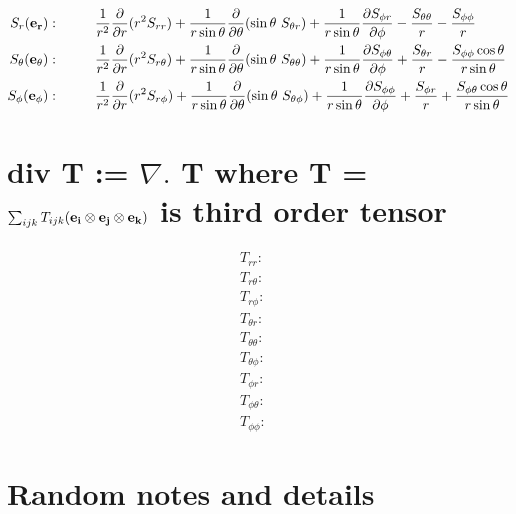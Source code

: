 \documentclass[11pt]{article}
\newcommand{\dr}{\frac{\partial}{\partial r}}
\begin{document}

\begin{align}
S_r ({\bf{e_r}}): & \hspace{1cm} \frac{1}{r^2}\dr (r^2 S_{rr}) + \frac{1}{r\sin{\theta}}\frac{\partial}{\partial \theta} (\sin{\theta} \ S_{\theta r}) + \frac{1}{r\sin{\theta}}\frac{\partial S_{\phi r}}{\partial \phi} - \frac{S_{\theta\theta}}{r} - \frac{S_{\phi\phi}}{r} \\
S_\theta ({\bf{e_\theta}}): & \hspace{1cm} \frac{1}{r^2}\dr (r^2 S_{r \theta}) + \frac{1}{r\sin{\theta}}\frac{\partial}{\partial \theta} (\sin{\theta} \ S_{\theta\theta}) + \frac{1}{r\sin{\theta}}\frac{\partial S_{\phi \theta}}{\partial \phi} + \frac{S_{\theta r}}{r} - \frac{S_{\phi\phi} \cos{\theta}}{r\sin{\theta}} \\
S_\phi ({\bf{e_\phi}}): & \hspace{1cm} \frac{1}{r^2}\dr (r^2 S_{r \phi}) + \frac{1}{r\sin{\theta}}\frac{\partial}{\partial \theta} (\sin{\theta} \ S_{\theta \phi}) + \frac{1}{r\sin{\theta}}\frac{\partial S_{\phi\phi}}{\partial \phi} + \frac{S_{\phi r}}{r} + \frac{S_{\phi \theta} \cos{\theta}}{r\sin{\theta}}
\end{align}


\section{div {\bf{T}} := $\nabla .$ {\bf{T}} where {\bf{T}} = $\sum_{ijk} T_{ijk} ({\bf{e_i}} \otimes {\bf{e_j}} \otimes {\bf{e_k}} )$ is third order tensor}

\begin{align}
T_{r r} : & \\
T_{r \theta} : & \\
T_{r \phi} : & \\
T_{\theta r} : & \\
T_{\theta \theta} : & \\
T_{\theta \phi} : & \\
T_{\phi r} : & \\
T_{\phi \theta} : & \\
T_{\phi \phi} : & 
\end{align}


\section{Random notes and details}
\end{document}
